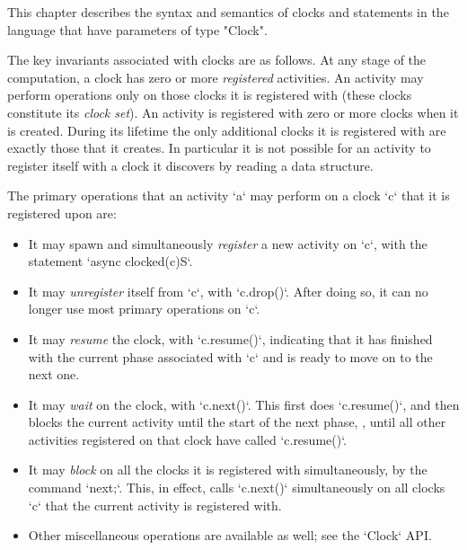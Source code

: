 This chapter describes the syntax and semantics of clocks and
statements in the language that have parameters of type \xcd"Clock". 

The key invariants associated with clocks are as follows.  At any
stage of the computation, a clock has zero or more {\em registered}
activities. An activity may perform operations only on those clocks it
is registered with (these clocks constitute its {\em clock set}).  An
activity is registered with zero or more clocks when it is created.
During its lifetime the only additional clocks it is registered with
are exactly those that it creates. In particular it is not possible
for an activity to register itself with a clock it discovers by
reading a data structure.

The primary operations that an activity \xcd`a` may perform on a clock \xcd`c`
that it is registered upon are: 
\begin{itemize}
\item It may spawn and simultaneously  {\em register} a new activity on
      \xcd`c`, with the statement       \xcd`async clocked(c){S}`.
\item It may {\em unregister} itself from \xcd`c`, with \xcd`c.drop()`.  After
      doing so, it can no longer use most primary operations on \xcd`c`.
\item It may {\em resume} the clock, with \xcd`c.resume()`, indicating that it
      has finished with the current phase associated with \xcd`c` and is ready
      to move on to the next one.
\item It may {\em wait} on the clock, with \xcd`c.next()`.  This first does
      \xcd`c.resume()`, and then blocks the current activity until the start
      of the next phase, \viz, until all other activities registered on that
      clock have called \xcd`c.resume()`.
\item It may {\em block} on all the clocks it is registered with
      simultaneously, by the command \xcd`next;`.  This, in effect, calls
      \xcd`c.next()` simultaneously 
      on all clocks \xcd`c` that the current activity is registered with.
\item Other miscellaneous operations are available as well; see the
      \xcd`Clock` API.
\end{itemize}

